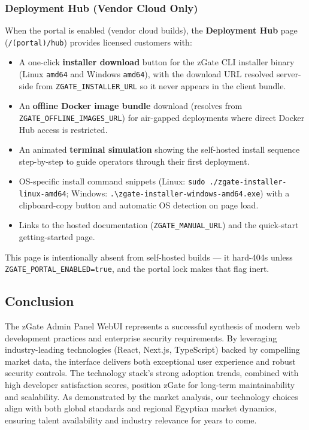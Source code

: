 \subsubsection{Deployment Hub (Vendor Cloud Only)}
When the portal is enabled (vendor cloud builds), the \textbf{Deployment Hub} page (\texttt{/(portal)/hub}) provides licensed customers with:
\begin{itemize}
    \item A one-click \textbf{installer download} button for the zGate CLI installer binary (Linux \texttt{amd64} and Windows \texttt{amd64}), with the download URL resolved server-side from \texttt{ZGATE\_INSTALLER\_URL} so it never appears in the client bundle.
    \item An \textbf{offline Docker image bundle} download (resolves from \texttt{ZGATE\_OFFLINE\_IMAGES\_URL}) for air-gapped deployments where direct Docker Hub access is restricted.
    \item An animated \textbf{terminal simulation} showing the self-hosted install sequence step-by-step to guide operators through their first deployment.
    \item OS-specific install command snippets (Linux: \texttt{sudo ./zgate-installer-linux-amd64}; Windows: \texttt{.\textbackslash{}zgate-installer-windows-amd64.exe}) with a clipboard-copy button and automatic OS detection on page load.
    \item Links to the hosted documentation (\texttt{ZGATE\_MANUAL\_URL}) and the quick-start getting-started page.
\end{itemize}
This page is intentionally absent from self-hosted builds --- it hard-404s unless \texttt{ZGATE\_PORTAL\_ENABLED=true}, and the portal lock makes that flag inert.


\subsection{Conclusion}

The zGate Admin Panel WebUI represents a successful synthesis of modern web development practices and enterprise security requirements. By leveraging industry-leading technologies (React, Next.js, TypeScript) backed by compelling market data, the interface delivers both exceptional user experience and robust security controls. The technology stack's strong adoption trends, combined with high developer satisfaction scores, position zGate for long-term maintainability and scalability. As demonstrated by the market analysis, our technology choices align with both global standards and regional Egyptian market dynamics, ensuring talent availability and industry relevance for years to come.

